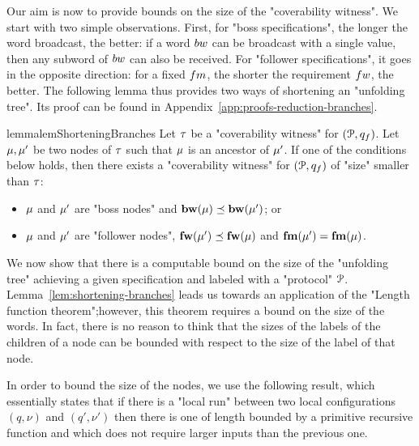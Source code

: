 Our aim is now to provide bounds on the size of the "coverability witness". We start with two simple observations. First, for "boss specifications", the longer the word broadcast, the better: if a word $\bossspec$ can be broadcast with a single value, then any subword of $\bossspec$ can also be received. 
For "follower specifications", it goes in the opposite direction: for a fixed $\followmessagespec$, the shorter the requirement $\followwordspec$, the better. The following lemma thus provides two ways of shortening an "unfolding tree". Its proof can be found in Appendix~\ref{app:proofs-reduction-branches}.

\begin{restatable}{lemma}{lemShorteningBranches} 
\label{lem:shortening-branches}
	Let $\tau$ be a "coverability witness" for $(\mathcal{P}, q_f)$.
	Let $\mu, \mu'$ be two nodes of $\tau$ such that $\mu$ is an ancestor of $\mu'$. If one of the conditions below holds, then there exists a "coverability witness" for $(\mathcal{P}, q_f)$ of "size" smaller than $\tau$:
	\begin{itemize}
	\item $\mu$ and $\mu'$ are "boss nodes" and $\mathbf{bw}(\mu) \preceq \mathbf{bw}(\mu')$; or
	\item $\mu$ and $\mu'$ are "follower nodes", $\mathbf{fw}(\mu') \preceq \mathbf{fw}(\mu)$ and $\mathbf{fm}(\mu')=\mathbf{fm}(\mu)$.
	\end{itemize} 
\end{restatable}


We now show that there is a computable bound on the size of the "unfolding tree" achieving a given specification and labeled with a "protocol" $\mathcal{P}$. Lemma~\ref{lem:shortening-branches} leads us towards an application of the "Length function theorem";however, this theorem requires a bound on the size of the words. In fact, there is no reason to think that the sizes of the labels of the children of a node can be bounded with respect to the size of the label of that node. 

In order to bound the size of the nodes, we use the following result, which essentially states that if there is a "local run" between two local configurations $(q, \nu)$ and $(q', \nu')$ then there is one of length bounded by a primitive recursive function and which does not require larger inputs than the previous one.

